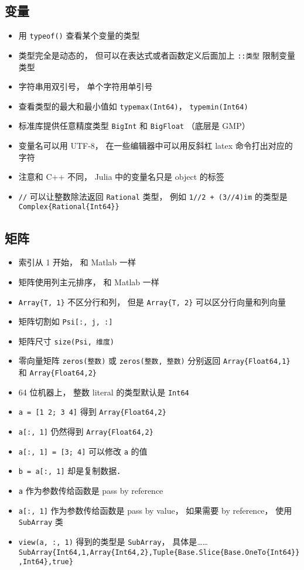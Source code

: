 \subsection{变量}
\begin{itemize}
\item 用 \verb|typeof()| 查看某个变量的类型
\item 类型完全是动态的， 但可以在表达式或者函数定义后面加上 \verb|::类型| 限制变量类型
\item 字符串用双引号， 单个字符用单引号
\item 查看类型的最大和最小值如 \verb|typemax(Int64)|， \verb|typemin(Int64)|
\item 标准库提供任意精度类型 \verb|BigInt| 和 \verb|BigFloat| （底层是 GMP）
\item 变量名可以用 UTF-8， 在一些编辑器中可以用反斜杠 latex 命令打出对应的字符
\item 注意和 C++ 不同， Julia 中的变量名只是 object 的标签
\item \verb|//| 可以让整数除法返回 \verb|Rational| 类型， 例如 \verb|1//2 + (3//4)im| 的类型是 \verb|Complex{Rational{Int64}}|
\end{itemize}

\subsection{矩阵}
\begin{itemize}
\item 索引从 1 开始， 和 Matlab 一样
\item 矩阵使用列主元排序， 和 Matlab 一样
\item \verb|Array{T, 1}| 不区分行和列， 但是 \verb|Array{T, 2}| 可以区分行向量和列向量
\item 矩阵切割如 \verb|Psi[:, j, :]|
\item 矩阵尺寸 \verb|size(Psi, 维度)|
\item 零向量矩阵 \verb|zeros(整数)| 或 \verb|zeros(整数, 整数)| 分别返回 \verb|Array{Float64,1}| 和 \verb|Array{Float64,2}|
\item 64 位机器上， 整数 literal 的类型默认是 \verb|Int64|
\item \verb|a = [1 2; 3 4]| 得到 \verb|Array{Float64,2}|
\item \verb|a[:, 1]| 仍然得到 \verb|Array{Float64,2}|
\item \verb|a[:, 1] = [3; 4]| 可以修改 \verb|a| 的值
\item \verb|b = a[:, 1]| 却是复制数据．
\item \verb|a| 作为参数传给函数是 pass by reference
\item \verb|a[:, 1]| 作为参数传给函数是 pass by value， 如果需要 by reference， 使用 \verb|SubArray| 类
\item \verb|view(a, :, 1)| 得到的类型是 \verb|SubArray|， 具体是…… \verb|SubArray{Int64,1,Array{Int64,2},Tuple{Base.Slice{Base.OneTo{Int64}},Int64},true}|
\end{itemize}

